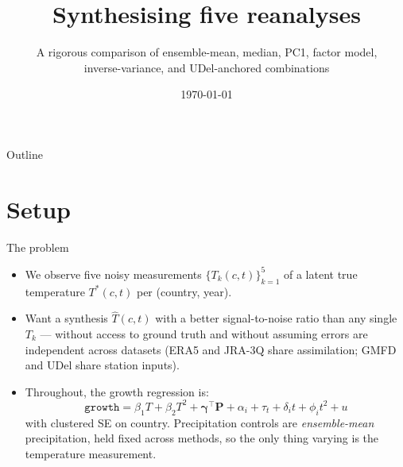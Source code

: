 \documentclass[10pt,aspectratio=169]{beamer}
\title{Synthesising five reanalyses}
\subtitle{A rigorous comparison of ensemble-mean, median, PC1, factor model, \\
  inverse-variance, and UDel-anchored combinations}
\author{}
\date{\today}
\begin{document}
\begin{frame}\titlepage\end{frame}

\begin{frame}{Outline}\tableofcontents\end{frame}

\section{Setup}

\begin{frame}{The problem}
  \begin{itemize}
    \item We observe five noisy measurements $\{T_k(c,t)\}_{k=1}^5$ of a
          latent true temperature $T^*(c,t)$ per (country, year).
    \item Want a synthesis $\hat T(c,t)$ with a better signal-to-noise
          ratio than any single $T_k$ --- without access to ground truth
          and without assuming errors are independent across datasets
          (ERA5 and JRA-3Q share assimilation; GMFD and UDel share station
          inputs).
    \item Throughout, the growth regression is:
      \[
      \texttt{growth} = \beta_1 T + \beta_2 T^2 + \boldsymbol\gamma^\top \mathbf{P}
          + \alpha_i + \tau_t + \delta_i t + \phi_i t^2 + u
      \]
      with clustered SE on country. Precipitation controls are
      \emph{ensemble-mean} precipitation, held fixed across methods, so the
      only thing varying is the temperature measurement.
  \end{itemize}
\end{frame}
\end{document}
